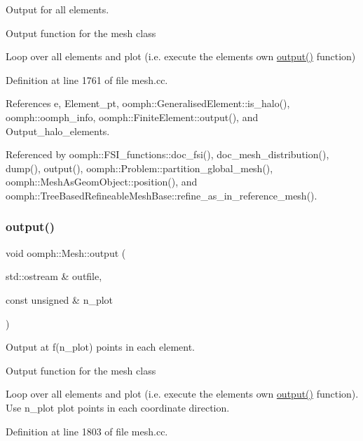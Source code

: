 Output for all elements. 

Output function for the mesh class

Loop over all elements and plot (i.\+e. execute the element\textquotesingle{}s own \hyperlink{classoomph_1_1Mesh_aab74388e8e21325f3ca26f1bd99c26f7}{output()} function) 

Definition at line 1761 of file mesh.\+cc.



References e, Element\+\_\+pt, oomph\+::\+Generalised\+Element\+::is\+\_\+halo(), oomph\+::oomph\+\_\+info, oomph\+::\+Finite\+Element\+::output(), and Output\+\_\+halo\+\_\+elements.



Referenced by oomph\+::\+F\+S\+I\+\_\+functions\+::doc\+\_\+fsi(), doc\+\_\+mesh\+\_\+distribution(), dump(), output(), oomph\+::\+Problem\+::partition\+\_\+global\+\_\+mesh(), oomph\+::\+Mesh\+As\+Geom\+Object\+::position(), and oomph\+::\+Tree\+Based\+Refineable\+Mesh\+Base\+::refine\+\_\+as\+\_\+in\+\_\+reference\+\_\+mesh().

\mbox{\label{classoomph_1_1Mesh_acdd7ba97e7b862988955fd0c4766ba4d}} 
\subsubsection{\texorpdfstring{output()}{output()}\hspace{0.1cm}{\footnotesize\ttfamily [2/6]}}
{\footnotesize\ttfamily void oomph\+::\+Mesh\+::output (\begin{DoxyParamCaption}\item[{std\+::ostream \&}]{outfile,  }\item[{const unsigned \&}]{n\+\_\+plot }\end{DoxyParamCaption})}



Output at f(n\+\_\+plot) points in each element. 

Output function for the mesh class

Loop over all elements and plot (i.\+e. execute the element\textquotesingle{}s own \hyperlink{classoomph_1_1Mesh_aab74388e8e21325f3ca26f1bd99c26f7}{output()} function). Use n\+\_\+plot plot points in each coordinate direction. 

Definition at line 1803 of file mesh.\+cc.



